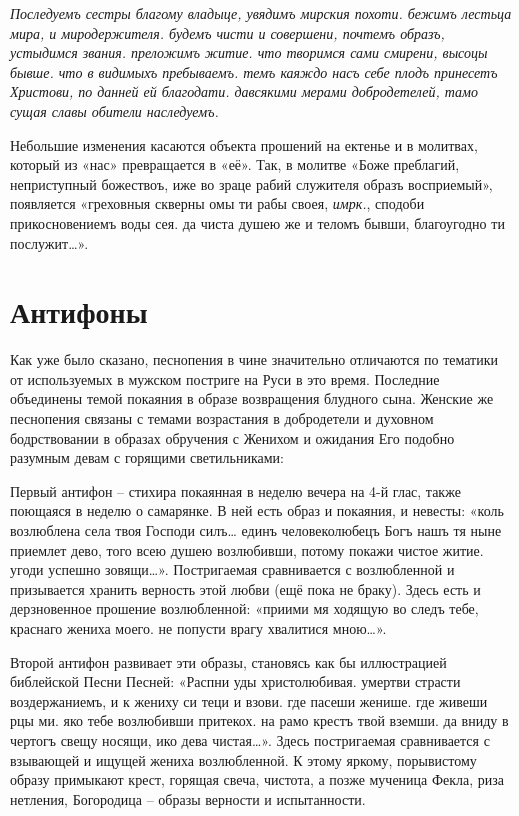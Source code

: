\textit{Последуемъ сестры благому владыце, увядимъ мирския похоти. бежимъ лестьца мира, и миродержителя. будемъ чисти и совершени, почтемъ образъ, устыдимся звания. преложимъ житие. что творимся сами смирени, высоцы бывше. что в видимыхъ пребываемъ. темъ каяждо насъ себе плодъ принесетъ Христови, по данней ей благодати. давсякими мерами добродетелей, тамо сущая славы обители наследуемъ.}

Небольшие изменения касаются объекта прошений на ектенье и в молитвах, который из «нас» превращается в «её».
Так, в молитве «Боже преблагий, неприступный божествоъ, иже во зраце рабий служителя образъ восприемый», появляется «греховныя скверны омы ти рабы своея, \emph{имрк.}, сподоби прикосновениемъ воды сея. да чиста душею же и теломъ бывши, благоугодно ти послужит\ldots{}».

\section*{Антифоны}\label{ux430ux43dux442ux438ux444ux43eux43dux44b}

Как уже было сказано, песнопения в чине значительно отличаются по тематики от используемых в мужском постриге на Руси в это время.
Последние объединены темой покаяния в образе возвращения блудного сына\cite[С.~144–145]{krasnoseltcev.uprazdnenniye.1889}.
Женские же песнопения связаны с темами возрастания в добродетели и духовном бодрствовании в образах обручения с Женихом и ожидания Его подобно разумным девам с горящими светильниками:

Первый антифон -- стихира покаянная в неделю вечера на 4-й глас, также поющаяся в неделю о самарянке.
В ней есть образ и покаяния, и невесты: «коль возлюблена села твоя Господи силъ\ldots{} единъ человеколюбецъ Богъ нашъ тя ныне приемлет дево, того всею душею возлюбивши, потому покажи чистое житие. угоди успешно зовящи\ldots{}».
Постригаемая сравнивается с возлюбленной и призывается хранить верность этой любви (ещё пока не браку).
Здесь есть и дерзновенное прошение возлюбленной: «приими мя ходящую во следъ тебе, краснаго жениха моего. не попусти врагу хвалитися мною\ldots{}».

Второй антифон развивает эти образы, становясь как бы иллюстрацией библейской Песни Песней: «Распни уды христолюбивая. умертви страсти воздержаниемъ, и к жениху си теци и взови. где пасеши женише. где живеши рцы ми. яко тебе возлюбивши притекох. на рамо крестъ твой вземши. да вниду в чертогъ свещу носящи, ико дева чистая\ldots{}».
Здесь постригаемая сравнивается с взывающей и ищущей жениха возлюбленной.
К этому яркому, порывистому образу примыкают крест, горящая свеча, чистота, а позже мученица Фекла, риза нетления, Богородица -- образы верности и испытанности.

